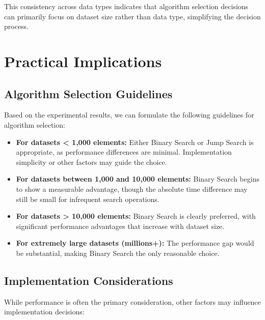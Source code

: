This consistency across data types indicates that algorithm selection decisions can primarily focus on dataset size rather than data type, simplifying the decision process.

\section{Practical Implications}

\subsection{Algorithm Selection Guidelines}
Based on the experimental results, we can formulate the following guidelines for algorithm selection:

\begin{itemize}
    \item \textbf{For datasets < 1,000 elements:} Either Binary Search or Jump Search is appropriate, as performance differences are minimal. Implementation simplicity or other factors may guide the choice.
    
    \item \textbf{For datasets between 1,000 and 10,000 elements:} Binary Search begins to show a measurable advantage, though the absolute time difference may still be small for infrequent search operations.
    
    \item \textbf{For datasets > 10,000 elements:} Binary Search is clearly preferred, with significant performance advantages that increase with dataset size.
    
    \item \textbf{For extremely large datasets (millions+):} The performance gap would be substantial, making Binary Search the only reasonable choice.
\end{itemize}

\subsection{Implementation Considerations}
While performance is often the primary consideration, other factors may influence implementation decisions:

